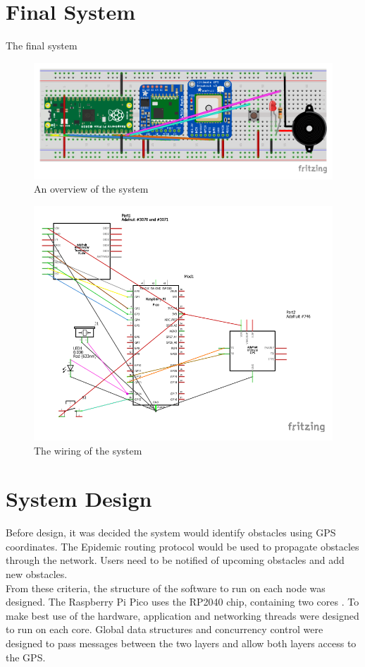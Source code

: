 \documentclass[12pt,a4paper]{report}
\begin{document}
\section{Final System}
The final system 
\begin{figure}[h]
\begin{center}
\includegraphics{breadboard.pdf}
\end{center}
\caption{An overview of the system}
\end{figure}

\begin{figure}[h]
\begin{center}
\includegraphics{wiring.pdf}
\end{center}
\caption{The wiring of the system}
\end{figure}

\section{System Design}
Before design, it was decided the system would identify obstacles using GPS coordinates. The Epidemic routing protocol would be used to propagate obstacles through the network. Users need to be notified of upcoming obstacles and add new obstacles. \\
From these criteria, the structure of the software to run on each node was designed. The Raspberry Pi Pico uses the RP2040 chip, containing two cores \cite{rp2040}. To make best use of the hardware, application and networking threads were designed to run on each core. Global data structures and concurrency control were designed to pass messages between the two layers and allow both layers access to the GPS. \\
\end{document}
